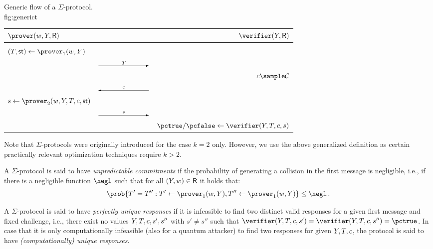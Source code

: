 \documentclass[runningheads]{llncs}
\begin{document}
\begin{definition}
\begin{description}
  \end{description}
    \begin{protocol}{Generic flow of a $\Sigma$-protocol.\\[-2.25em]}{fig:generic}{t}
      \begin{tabular}{@{}l@{\hspace{-2em}}c@{\hspace{-2em}}r@{}}
        $\prover(\witness,Y,\relation)$ & & $\verifier(Y,\relation)$  \\
        \hline  \\
        $(\commitment,\st) \gets \prover_1(\witness,\statement)$\\
        & $\sendr{T}{100}$ \\[2 ex]
        & & $c \sample \CS$ \\
        & $\sendl{c}{100}$ & \\[2 ex]
        $ s \gets \prover_2(\witness,\statement,\commitment,\challenge,\st)$\\
        & $\sendr{s}{100}$ \\[2 ex]
        & & $\accept/\reject \gets \verifier(\statement,\commitment,\challenge,s)$ \\
      \end{tabular}
    \end{protocol}
\end{definition}
Note that $\Sigma$-protocols were originally introduced for the case $k=2$ only.
However, we use the above generalized definition as certain practically relevant optimization techniques require $k>2$.

A $\Sigma$-protocol is said to have \emph{unpredictable commitments} if the probability of generating a collision in the first message is negligible, i.e., if there is a negligible function $\negl$ such that for all $(Y,w)\in\mathsf{R}$ it holds that:
\[
  \prob{T'=T'' : T'\gets\prover_1(\witness,\statement), T''\gets\prover_1(\witness,\statement)} \leq \negl\,.
\]

A $\Sigma$-protocol is said to have \emph{perfectly unique responses} if it is infeasible to find two distinct valid responses for a given first message and fixed challenge, i.e., there exist no values $Y,T,c,s',s''$ with $s'\ne s''$ such that $\verifier(\statement,\commitment,\challenge,s')=\verifier(\statement,\commitment,\challenge,s'')=\accept$.
In case that it is only computationally infeasible (also for a quantum attacker) to find two responses for given $Y, T,c$, the protocol is said to have \emph{(computationally) unique responses}.
\end{document}
